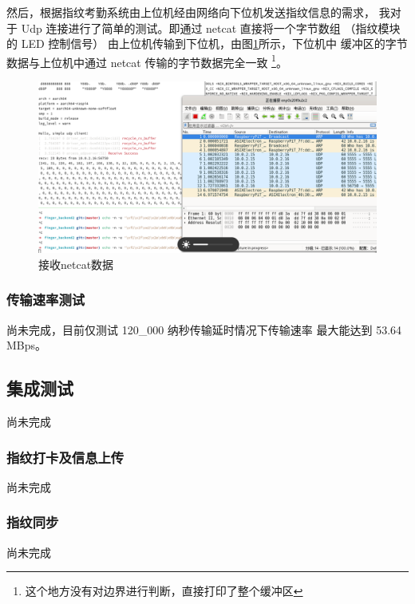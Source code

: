    然后，根据指纹考勤系统由上位机经由网络向下位机发送指纹信息的需求，
    我对于 Udp 连接进行了简单的测试。即通过 netcat 直接将一个字节数组
    （指纹模块的 LED 控制信号）
    由上位机传输到下位机，由图\ref{test::接收netcat数据}所示，下位机中
    缓冲区的字节数据与上位机中通过 netcat 传输的字节数据完全一致
    \footnote{这个地方没有对边界进行判断，直接打印了整个缓冲区}。

    \begin{figure}[H]
        \centering
        \includegraphics[width=\textwidth]{./imgs/测试-接收netcat数据.png}
        \caption{接收netcat数据}    \label{test::接收netcat数据}
    \end{figure}   

    \subsubsection{传输速率测试}

    尚未完成，目前仅测试 120\_000 纳秒传输延时情况下传输速率
    最大能达到 53.64 MBps。

    \subsection{集成测试}

    尚未完成

    \subsubsection{指纹打卡及信息上传}

    尚未完成

    \subsubsection{指纹同步}

    尚未完成